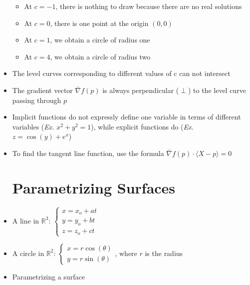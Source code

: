 \begin{itemize}
    \begin{itemize}

      \item At $c=-1$, there is nothing to draw because there are no real solutions

      \item At $c=0$, there is one point at the origin $(0,0)$

      \item At $c=1$, we obtain a circle of radius one

      \item At $c=4$, we obtain a circle of radius two

    \end{itemize}

  \item The level curves corresponding to different values of c can not intersect

  \item The gradient vector $\overline{\nabla} f(p)$ is always perpendicular ($\perp$) to the level curve passing through $p$

  \item Implicit functions do not expressly define one variable in terms of different variables (\textit{Ex.} $x^2+y^2=1$), while explicit functions do (\textit{Ex.} $z=\cos(y)+e^x$)

  \item To find the tangent line function, use the formula $\overline{\nabla} f(p) \cdot \langle X - p\rangle = 0$

    \section{Parametrizing Surfaces}

  \item A line in $\mathbb{R}^3$: $\left\{\begin{array}{c} x = x_o + at\\ y = y_o + bt\\ z = z_o + ct  \end{array}$

  \item A circle in $\mathbb{R}^2$: $\left\{\begin{array}{c} x = r\cos(\theta)\\ y = r\sin(\theta)  \end{array}$, where $r$ is the radius

  \item Parametrizing a surface


\end{itemize}
